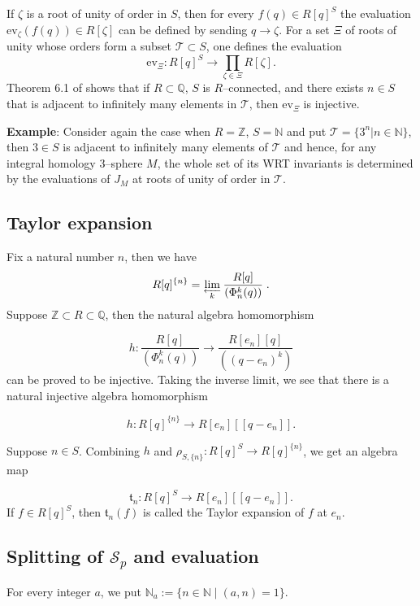 \documentclass[12pt]{amsart}
\theoremstyle{plain}
\theoremstyle{definition}
\def\BZ{\mathbb Z}
\def\BQ{\mathbb Q}
\def\cT{\mathcal T}
\def\N{{\mathbb N}}
\def\calS{\mathcal S}
\def\Z{\BZ}
\def\Q{\BQ}
\def\ev{\mathrm{ev}}
\begin{document}
If $\zeta$ is a root of unity of order in $S$, then for every $f(q)\in R[q]^S$
the evaluation $\ev_\zeta(f(q))\in R[\zeta]$ can be defined by sending
$q\to\zeta$.
For a set $\Xi$ of roots of unity whose orders form a subset
$\cT\subset S$, one defines the evaluation
\[
\ev_\Xi: R[q]^S \to \prod_{\zeta \in \Xi} R[\zeta].
\]
Theorem 6.1 of \cite{Ha1} shows that if
$R\subset \Q$, $S$ is $R$--connected, and there
exists $n\in S$ that is adjacent to infinitely many elements in
$\cT$, then $\ev_\Xi$ is injective.

\vskip2mm
\noindent
{\bf Example}: Consider again the case when $R=\Z$, $S=\N$
and put $\cT=\{3^n| n\in \N\}$, then $3\in S$ is adjacent to infinitely many
elements of $\cT$ and hence, for any integral homology 3--sphere $M$,
the whole set of its WRT invariants is determined by the evaluations
of $J_M$ at roots of unity of order in $\cT$.
\vskip2mm




\subsection{Taylor expansion} Fix a natural number $n$, then we have
$$ R[q]^{\{n\}} =
\lim_{\overleftarrow{\hspace{2mm}k\hspace{2mm}}}
\frac{R[q]}{(\Phi^k_n(q))}\; .$$
Suppose $ \Z \subset R \subset \Q$, then the natural algebra homomorphism

$$ h: \frac{R[q]}{(\Phi^k_n(q))} \to \frac{R[e_n][q]}{((q-e_n)^k)}$$
can be proved to be
 injective. Taking the inverse limit, we see that there is a natural injective algebra homomorphism

$$ h : R[q]^{\{n\}} \to R[e_n][[q-e_n]].$$

Suppose $n \in S$. Combining $h$ and $\rho_{S, \{n\}}: R[q]^S \to R[q]^{\{n\}}$, we get an algebra map

\newcommand{\TT}{{\mathfrak t}}

$$ \TT_n: R[q]^S \to R[e_n][[q-e_n]].$$
If $f\in R[q]^S$, then $\TT_n(f)$ is called the Taylor expansion of $f$ at $e_n$.


\subsection{Splitting of $\calS_p$ and evaluation}
For every integer $a$, we put $\N_a := \{ n \in \N \mid (a,n)=1\}$.
\end{document}
